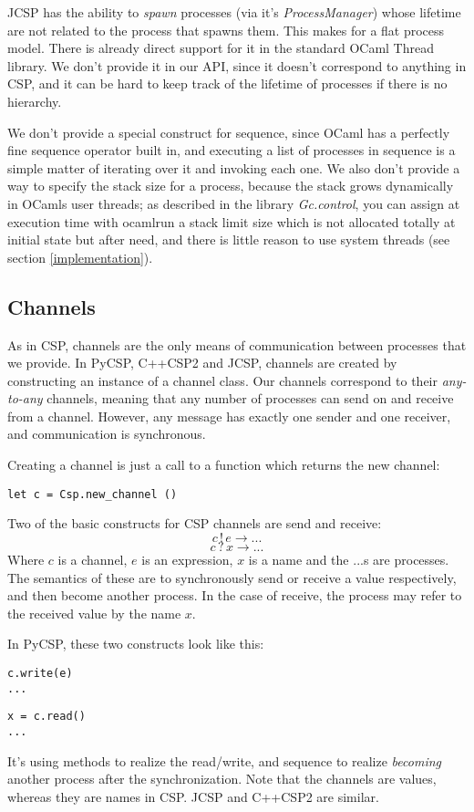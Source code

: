 \documentclass[a4paper,12pt]{article}
\begin{document}
JCSP has the ability to \emph{spawn} processes (via it's \emph{ProcessManager})
whose lifetime are not related to the process that spawns them. This makes for
a flat process model. There is already direct support for it in the standard
OCaml Thread library. We don't provide it in our API, since it doesn't
correspond to anything in CSP, and it can be hard to keep track of the lifetime
of processes if there is no hierarchy.

We don't provide a special construct for sequence, since OCaml has a perfectly
fine sequence operator built in, and executing a list of processes in sequence
is a simple matter of iterating over it and invoking each one. We also don't
provide a way to specify the stack size for a process, because the stack grows
dynamically in OCamls user threads; as described in the library {\it
Gc.control}, you can assign at execution time with ocamlrun a stack limit size
which is not allocated totally at initial state but after need, and there is
little reason to use system threads (see section \ref{implementation}).

\subsection{Channels}

As in CSP, channels are the only means of communication between processes that we provide.
In PyCSP, C++CSP2 and JCSP, channels are created by constructing an instance of a channel
class. Our channels correspond to their \emph{any-to-any} channels, meaning that any number
of processes can send on and receive from a channel. However, any message has exactly 
one sender and one receiver, and communication is synchronous.

Creating a channel is just a call to a function which returns the new channel:
\begin{verbatim}
let c = Csp.new_channel ()
\end{verbatim}

Two of the basic constructs for CSP channels are send and receive:
\[c\,!\,e \to ...\]
\[c\,?\,x \to ...\]
Where $c$ is a channel, $e$ is an expression, $x$ is a name and the $...$s are processes. 
The semantics of these are to synchronously send or receive a value respectively, and
then become another process. In the case of receive, the process may refer to the
received value by the name $x$.

In PyCSP, these two constructs look like this:
\begin{verbatim}
c.write(e)
...
\end{verbatim}
\begin{verbatim}
x = c.read()
...
\end{verbatim}
It's using methods to realize the read/write, and sequence to realize \emph{becoming}
another process after the synchronization. Note that the channels are values, whereas
they are names in CSP. JCSP and C++CSP2 are similar.
\end{document}
